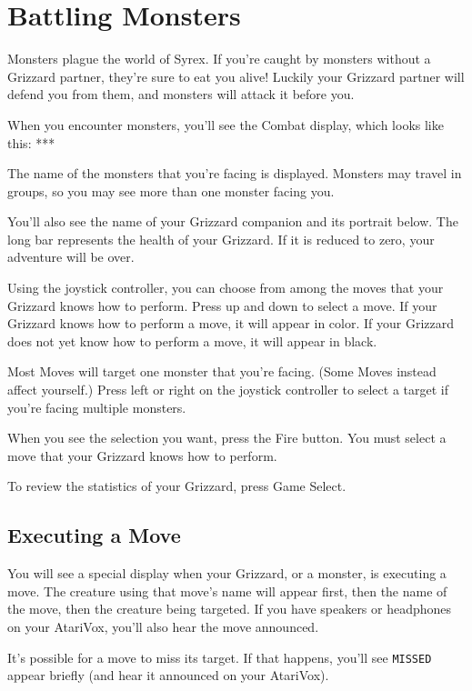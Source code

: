 \documentclass[10pt,twocolumn,openany,article]{memoir}
\begin{document}
\section{Battling Monsters}

Monsters plague the world of Syrex. If you're caught by monsters without
a Grizzard partner, they're sure to eat you alive! Luckily your Grizzard
partner  will  defend  you  from  them,  and  monsters  will  attack  it
before you.

When you encounter monsters, you'll  see the Combat display, which looks
like this: ***

The name of  the monsters that you're facing is  displayed. Monsters may
travel in groups, so you may see more than one monster facing you.

You'll also  see the name  of your  Grizzard companion and  its portrait
below. The  long bar represents  the health of  your Grizzard. If  it is
reduced to zero, your adventure will be over.

Using the joystick controller, you can  choose from among the moves that
your Grizzard knows how to perform. Press  up and down to select a move.
If your Grizzard knows  how to perform a move, it  will appear in color.
If your Grizzard does not yet know how to perform a move, it will appear
in black.

Most  Moves will  target one  monster  that you're  facing. (Some  Moves
instead affect yourself.) Press left or right on the joystick controller
to select a target if you're facing multiple monsters.

When you  see the selection  you want, press  the Fire button.  You must
select a move that your Grizzard knows how to perform.

To review the statistics of your Grizzard, press Game Select.

\subsection{Executing a Move}

You will  see a  special display  when your Grizzard,  or a  monster, is
executing a move. The creature using that move's name will appear first,
then the name of the move, then the creature being targeted. If you have
speakers  or  headphones   on  your  AtariVox,  you'll   also  hear  the
move announced.

It's possible for a move to miss its target. If that happens, you'll see
\texttt{MISSED} appear briefly (and hear it announced on your AtariVox).
\end{document}
